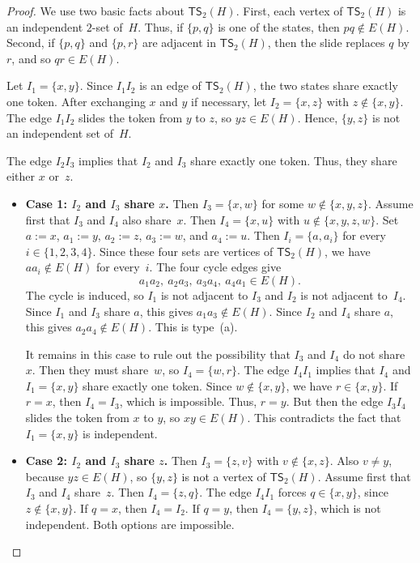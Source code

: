 \documentclass[a4paper]{article}
\theoremstyle{plain}
\theoremstyle{definition}
\newcommand{\TSsym}{\mathsf{TS}}
\numberwithin{equation}{section}
\begin{document}
\begin{proof}
We use two basic facts about $\TSsym_2(H)$.
First, each vertex of $\TSsym_2(H)$ is an independent $2$-set of~$H$.
Thus, if $\{p,q\}$ is one of the states, then $pq\notin E(H)$.
Second, if $\{p,q\}$ and $\{p,r\}$ are adjacent in $\TSsym_2(H)$, then the slide replaces $q$ by $r$, and so $qr\in E(H)$.

Let $I_1=\{x,y\}$.
Since $I_1I_2$ is an edge of $\TSsym_2(H)$, the two states share exactly one token.
After exchanging $x$ and $y$ if necessary, let $I_2=\{x,z\}$ with $z\notin\{x,y\}$.
The edge $I_1I_2$ slides the token from $y$ to $z$, so $yz\in E(H)$.
Hence, $\{y,z\}$ is not an independent set of~$H$.

The edge $I_2I_3$ implies that $I_2$ and $I_3$ share exactly one token.
Thus, they share either $x$ or~$z$.

\begin{itemize}
\item \textbf{Case 1: $I_2$ and $I_3$ share $x$.}
Then $I_3=\{x,w\}$ for some $w\notin\{x,y,z\}$.
Assume first that $I_3$ and $I_4$ also share~$x$.
Then $I_4=\{x,u\}$ with $u\notin\{x,y,z,w\}$.
Set $a:=x$, $a_1:=y$, $a_2:=z$, $a_3:=w$, and $a_4:=u$.
Then $I_i=\{a,a_i\}$ for every $i\in\{1,2,3,4\}$.
Since these four sets are vertices of $\TSsym_2(H)$, we have $aa_i\notin E(H)$ for every~$i$.
The four cycle edges give
\[
a_1a_2,\ a_2a_3,\ a_3a_4,\ a_4a_1\in E(H).
\]
The cycle is induced, so $I_1$ is not adjacent to $I_3$ and $I_2$ is not adjacent to~$I_4$.
Since $I_1$ and $I_3$ share $a$, this gives $a_1a_3\notin E(H)$.
Since $I_2$ and $I_4$ share $a$, this gives $a_2a_4\notin E(H)$.
This is type~\textup{(a)}.

It remains in this case to rule out the possibility that $I_3$ and $I_4$ do not share~$x$.
Then they must share~$w$, so $I_4=\{w,r\}$.
The edge $I_4I_1$ implies that $I_4$ and $I_1=\{x,y\}$ share exactly one token.
Since $w\notin\{x,y\}$, we have $r\in\{x,y\}$.
If $r=x$, then $I_4=I_3$, which is impossible.
Thus, $r=y$.
But then the edge $I_3I_4$ slides the token from $x$ to $y$, so $xy\in E(H)$.
This contradicts the fact that $I_1=\{x,y\}$ is independent.

\item \textbf{Case 2: $I_2$ and $I_3$ share $z$.}
Then $I_3=\{z,v\}$ with $v\notin\{x,z\}$.
Also $v\ne y$, because $yz\in E(H)$, so $\{y,z\}$ is not a vertex of $\TSsym_2(H)$.
Assume first that $I_3$ and $I_4$ share~$z$.
Then $I_4=\{z,q\}$.
The edge $I_4I_1$ forces $q\in\{x,y\}$, since $z\notin\{x,y\}$.
If $q=x$, then $I_4=I_2$.
If $q=y$, then $I_4=\{y,z\}$, which is not independent.
Both options are impossible.


\end{itemize}
\end{proof}
\end{document}
